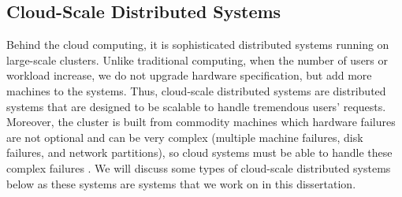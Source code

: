 \subsection{Cloud-Scale Distributed Systems}

Behind the cloud computing, it is sophisticated distributed systems running on
large-scale clusters. Unlike traditional computing, when the number of users or
workload increase, we do not upgrade hardware specification, but add more
machines to the systems. Thus, cloud-scale distributed systems are distributed
systems that are designed to be scalable to handle tremendous users' requests.
Moreover, the cluster is built from commodity machines which hardware failures
are not optional and can be very complex (\eg multiple machine failures, disk
failures, and network partitions), so cloud systems must be able to handle
these complex failures \cite{Abadi09-Cloud, Gunawi+11-FaaS-TR,
Hamilton07-Deploying}.  We will discuss some types of cloud-scale distributed
systems below as these systems are systems that we work on in this
dissertation.

